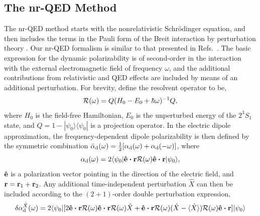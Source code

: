 \documentclass[%
 amsmath,amssymb,
aps,
]{revtex4-2}
\def\edotr{\mbox{\boldmath{$\hat{\bf e}\cdot {\bf r}$}}}
\begin{document}
\subsection{The nr-QED Method}
The nr-QED method starts with the nonrelativistic Schr\"odinger equation, and then includes the terms in the Pauli form of the Breit interaction by perturbation theory \cite{BetheSalpeter}.  Our nr-QED formalism is similar to that presented in Refs.~\cite{Piszczatowski2015,Puchalski2016,PhysRevA.101.022505}.  The basic expression for the dynamic polarizability is of second-order in the interaction with the external electromagnetic field of frequency $\omega$, and the additional contributions from relativistic and QED effects are included by means of an additional perturbation.  For brevity, define the resolvent operator to be,
\begin{equation}
{\cal R}(\omega) = Q(H_0 - E_0 + \hbar\omega)^{-1}Q,
\end{equation}
 where $H_0$ is the field-free Hamiltonian, $E_0$ is the unperturbed energy of the $2^3S_1$ state, and $Q = 1 - |\psi_0\rangle\langle \psi_0|$ is a projection operator.  In the electric dipole approximation, the frequency-dependent dipole polarizability is then defined by the symmetric combination
  $\bar{\alpha}_{\rm d}(\omega) = \frac12[\alpha_{\rm d}(\omega) + \alpha_{\rm d}(-\omega)]$, where
\begin{equation}
\alpha_{\rm d}(\omega) = 2\langle\psi_0|\edotr{\cal R}(\omega)\edotr|\psi_0\rangle,
\end{equation}
$\mbox{\boldmath{$\hat{\rm e}$}}$ is a polarization vector pointing in the direction of the electric field, and ${\bf r} = {\bf r}_1 + {\bf r}_2$.  Any additional time-independent perturbation $\hat{X}$ can then be included according to the $(2+1)$-order double perturbation expression,
\begin{equation}
\delta\alpha_{\rm d}^{\hat{X}}(\omega) = 2\langle\psi_0|[2\edotr{\cal R}(\omega)\edotr{\cal R}(\omega)\hat{X}
+ \edotr{\cal R}(\omega)(\hat{X} - \langle\hat{X}\rangle){\cal R}(\omega)\edotr]|\psi_0\rangle
\end{equation}
\end{document}
